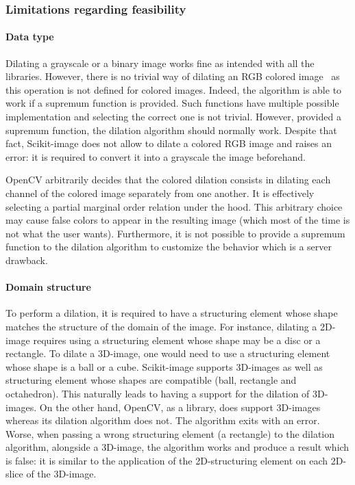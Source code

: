 \subsubsection{Limitations regarding feasibility}

\paragraph{Data type} Dilating a grayscale or a binary image works fine as intended with all the libraries. However,
there is no trivial way of dilating an RGB colored image~\parencite{angulo.2007.morpho_color,dewitte.2005.morpho_color}
as this operation is not defined for colored images. Indeed, the algorithm is able to work if a supremum function is
provided. Such functions have multiple possible implementation and selecting the correct one is not trivial. However,
provided a supremum function, the dilation algorithm should normally work. Despite that fact, Scikit-image does not
allow to dilate a colored RGB image and raises an error: it is required to convert it into a grayscale the image
beforehand.

OpenCV arbitrarily decides that the colored dilation consists in dilating each channel of the colored image separately
from one another. It is effectively selecting a partial marginal order relation under the hood. This arbitrary choice
may cause false colors to appear in the resulting image (which most of the time is not what the user wants).
Furthermore, it is not possible to provide a supremum function to the dilation algorithm to customize the behavior which
is a server drawback.

\paragraph{Domain structure} To perform a dilation, it is required to have a structuring element whose shape matches the
structure of the domain of the image. For instance, dilating a 2D-image requires using a structuring element whose shape
may be a disc or a rectangle. To dilate a 3D-image, one would need to use a structuring element whose shape is a ball or
a cube. Scikit-image supports 3D-images as well as structuring element whose shapes are compatible (ball, rectangle and
octahedron). This naturally leads to having a support for the dilation of 3D-images. On the other hand, OpenCV, as a
library, does support 3D-images whereas its dilation algorithm does not. The algorithm exits with an error. Worse, when
passing a wrong structuring element (a rectangle) to the dilation algorithm, alongside a 3D-image, the algorithm works
and produce a result which is false: it is similar to the application of the 2D-structuring element on each 2D-slice of
the 3D-image.


